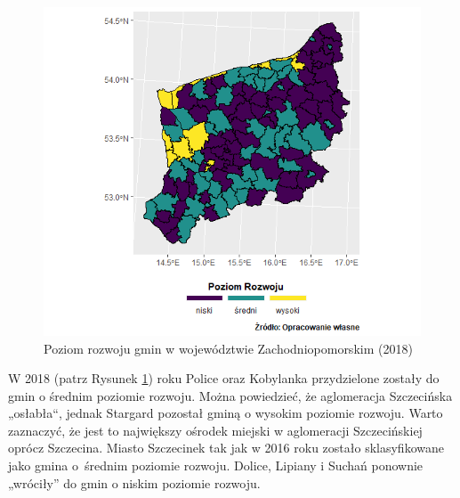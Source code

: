 \documentclass{amuthesis}
\begin{document}
\begin{figure}[t]

{\centering \includegraphics[width=1\linewidth]{figures/mapa_2018_bez} 

}

\caption{Poziom rozwoju gmin w województwie Zachodniopomorskim (2018)}\label{fig:rycina8}
\end{figure}

W 2018 (patrz Rysunek \ref{fig:rycina8}) roku Police oraz Kobylanka przydzielone zostały do gmin o średnim poziomie rozwoju. Można powiedzieć, że aglomeracja Szczecińska „osłabła``, jednak Stargard pozostał gminą o wysokim poziomie rozwoju. Warto zaznaczyć, że jest to największy ośrodek miejski w aglomeracji Szczecińskiej oprócz Szczecina.
Miasto Szczecinek tak jak w 2016 roku zostało sklasyfikowane jako gmina o~średnim poziomie rozwoju.
Dolice, Lipiany i Suchań ponownie „wróciły'' do gmin o niskim poziomie rozwoju.
\end{document}

